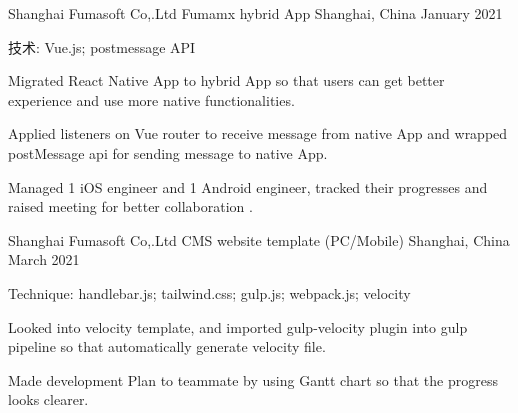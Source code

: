 

\begin{cventries}

  \cventry
    {Shanghai Fumasoft Co,.Ltd} %
    {Fumamx hybrid App} %
    {Shanghai, China} %
    {January 2021} %
    {
      \begin{cvitems} %
        \item {技术: Vue.js; postmessage API}
        \item {Migrated React Native App to hybrid App so that users can get better experience and use more native functionalities.}
        \item {Applied listeners on Vue router to receive message from native App and wrapped postMessage api for sending message to native App.}
        \item {Managed 1 iOS engineer and 1 Android engineer, tracked their progresses and raised meeting for better collaboration .}
      \end{cvitems}
    }


    \cventry
    {Shanghai Fumasoft Co,.Ltd} %
    {CMS website template (PC/Mobile)} %
    {Shanghai, China} %
    {March 2021} %
    {
      \begin{cvitems} %
        \item {Technique: handlebar.js; tailwind.css; gulp.js; webpack.js; velocity }
        \item {Looked into velocity template, and imported gulp-velocity plugin into gulp pipeline so that automatically generate velocity file.}
        \item {Made development Plan to teammate by using Gantt chart so that the progress looks clearer.}
      \end{cvitems}
    }
    
    

\end{cventries}
